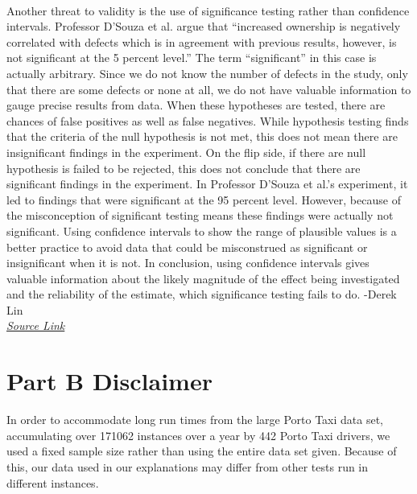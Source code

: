 \documentclass{article}
\begin{document}
    \\ \indent Another threat to validity is the use of significance testing rather than confidence intervals. Professor D’Souza et al. argue that “increased ownership is negatively correlated with defects which is in agreement with previous results, however, is not significant at the 5 percent level.” The term “significant” in this case is actually arbitrary. Since we do not know the number of defects in the study, only that there are some defects or none at all, we do not have valuable information to gauge precise results from data. When these hypotheses are tested, there are chances of false positives as well as false negatives. While hypothesis testing finds that the criteria of the null hypothesis is not met, this does not mean there are insignificant findings in the experiment. On the flip side, if there are null hypothesis is failed to be rejected, this does not conclude that there are significant findings in the experiment. In Professor D’Souza et al.’s experiment, it led to findings that were significant at the 95 percent level. However, because of the misconception of significant testing means these findings were actually not significant. Using confidence intervals to show the range of plausible values is a better practice to avoid data that could be misconstrued as significant or insignificant when it is not. In conclusion, using confidence intervals gives valuable information about the likely magnitude of the effect being investigated and the reliability of the estimate, which significance testing fails to do. -Derek Lin
    \\
    \href{https://citeseerx.ist.psu.edu/viewdoc/download?doi=10.1.1.303.4662&rep=rep1&type=pdf}{\textit{Source Link}}

\section{Part B Disclaimer}
\indent In order to accommodate long run times from the large Porto Taxi data set, accumulating over 171062 instances over a year by 442 Porto Taxi drivers, we used a fixed sample size rather than using the entire data set given. Because of this, our data used in our explanations may differ from other tests run in different instances.
\end{document}
